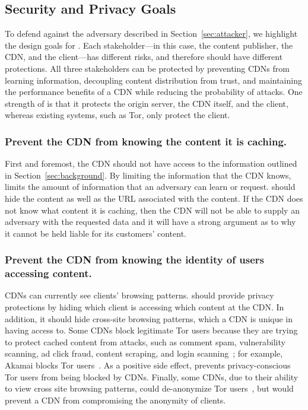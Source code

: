 \subsection{Security and Privacy Goals}
\label{sec:goals}

To defend against the adversary described in Section~\ref{sec:attacker}, we
highlight the design goals for \system{}.  Each stakeholder---in this case,
the content publisher, the CDN, and the client---has different risks, and
therefore should have different protections.  All three stakeholders  can be
protected by preventing CDNs from learning information, decoupling content
distribution from trust, and  maintaining the performance benefits of a CDN
while reducing the probability of attacks.   One strength of \system{} is that
it protects the origin server, the CDN itself, and the client, whereas
existing systems, such as Tor, only protect the client.


\subsubsection{Prevent the CDN from knowing the content it is caching.} \label{sec:contentgoal}
First and foremost, the CDN 
should not have access to the information outlined 
in Section~\ref{sec:background}.  By limiting the information that the CDN knows,
\system{} limits 
the amount of information that an adversary can learn or request. \system{} should hide 
the content as well as the URL associated with the content.  If the CDN 
does not know what content it is caching, then the CDN will not be able to supply an adversary 
with the requested data and it will have a strong argument as to why it cannot be held 
liable for its customers' content.

\subsubsection{Prevent the CDN from knowing the identity of users accessing content.} \label{sec:usergoal}
CDNs can currently see clients' 
browsing patterns. \system{} should provide privacy protections by hiding which client is accessing 
which content at the CDN.  In addition, it should hide cross-site browsing patterns,
which a CDN 
is unique in having access to.  Some CDNs block legitimate Tor users because they are 
trying to protect cached content from attacks, such as comment spam, vulnerability scanning, 
ad click fraud, content scraping, and login scanning~\cite{ars_tor}; for example,
Akamai blocks Tor users~\cite{khattak2016you}. As a positive side effect, \system{}
prevents
privacy-conscious Tor users from being blocked by CDNs.  Finally, some CDNs, due
to their ability
to view cross site browsing patterns, could de-anonymize Tor users~\cite{cloudflare_tor}, but \system{} would 
prevent a CDN from compromising the anonymity of clients.



